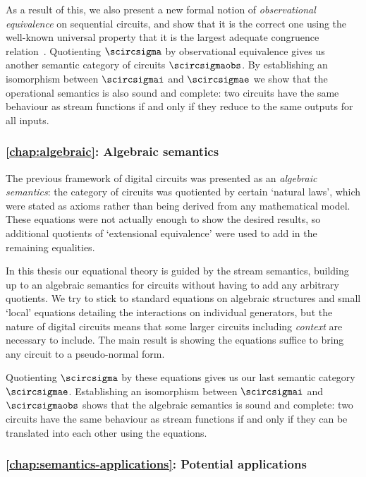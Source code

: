 As a result of this, we also present a new formal notion of
\emph{observational equivalence} on sequential circuits, and show that it is the
correct one using the well-known universal property that it is the largest
adequate congruence relation~\cite{gordon1998operational}.
Quotienting \(\scircsigma\) by observational equivalence gives us another
semantic category of circuits \(\scircsigmaobs\).
By establishing an isomorphism between \(\scircsigmai\) and \(\scircsigmae\)
we show that the operational semantics is also sound and complete: two circuits
have the same behaviour as stream functions if and only if they reduce to the
same outputs for all inputs.

\subsubsection{\cref{chap:algebraic}: Algebraic semantics}

The previous framework of digital circuits was presented as an
\emph{algebraic semantics}: the category of circuits was quotiented by certain
`natural laws', which were stated as axioms rather than being derived from any
mathematical model.
These equations were not actually enough to show the desired results, so
additional quotients of `extensional equivalence' were used to add in the
remaining equalities.

In this thesis our equational theory is guided by the stream semantics,
building up to an algebraic semantics for circuits without having to add any
arbitrary quotients.
We try to stick to standard equations on algebraic structures and small `local'
equations detailing the interactions on individual generators, but the nature of
digital circuits means that some larger circuits including \emph{context} are
necessary to include.
The main result is showing the equations suffice to bring any circuit to a
pseudo-normal form.

Quotienting \(\scircsigma\) by these equations gives us our last semantic
category \(\scircsigmae\).
Establishing an isomorphism between \(\scircsigmai\)
and \(\scircsigmaobs\) shows that the algebraic semantics is sound and complete:
two circuits have the same behaviour as stream functions if and only if they
can be translated into each other using the equations.

\subsubsection{\cref{chap:semantics-applications}: Potential applications}

